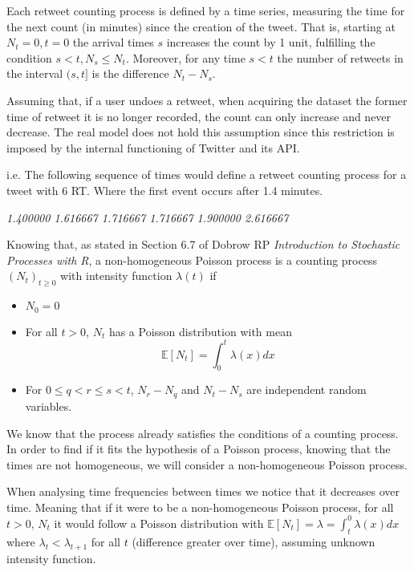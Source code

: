 Each retweet counting process is defined by a time series, measuring the time for the next count (in minutes) since the creation of the tweet. 
That is, starting at $N_t=0, t=0$ the arrival times $s$ increases the count by 1 unit, fulfilling the condition $s<t, N_s \leq N_t$. Moreover, for any time $s<t$ the number of retweets in the interval $(s, t]$ is the difference $N_t -N_s$. 

Assuming that, if a user undoes a retweet, when acquiring the dataset the former time of retweet it is no longer recorded, the count can only increase and never decrease. 
The real model does not hold this assumption since this restriction is imposed by the internal functioning of Twitter and its API. 

i.e. The following sequence of times would define a retweet counting process for a tweet with 6 RT. 
Where the first event occurs after 1.4 minutes.

\begin{center}
\textit{1.400000    1.616667    1.716667    1.716667    1.900000    2.616667}
\end{center}

Knowing that, as stated in Section 6.7 of Dobrow RP \textit{Introduction to Stochastic Processes with R}, a non-homogeneous Poisson process is a counting process $(N_t)_{t\geq0}$ with intensity function $\lambda(t)$ if
\begin{itemize}
	\item $N_0 = 0$ 
	\item For all $t>0$, $N_t$ has a Poisson distribution with mean
	\[\mathbb{E}[N_t] = \int^t_0\lambda(x)dx\]
	\item For $0\leq q < r \leq s < t$, $N_r - N_q$ and $N_t - N_s$ are independent random variables.
\end{itemize}

We know that the process already satisfies the conditions of a counting process. In order to find if it fits the hypothesis of a Poisson process, knowing that the times are not homogeneous, we will consider a non-homogeneous Poisson process.

When analysing time frequencies between times we notice that it decreases over time. Meaning that if it were to be a non-homogeneous Poisson process, for all $t>0$, $N_t$ it would follow a Poisson distribution with $\mathbb{E}[N_t] = \lambda = \int_{t}^{0} \lambda(x)dx$ where $\lambda_t < \lambda_{t+1}$ for all $t$ (difference greater over time), assuming unknown intensity function.


